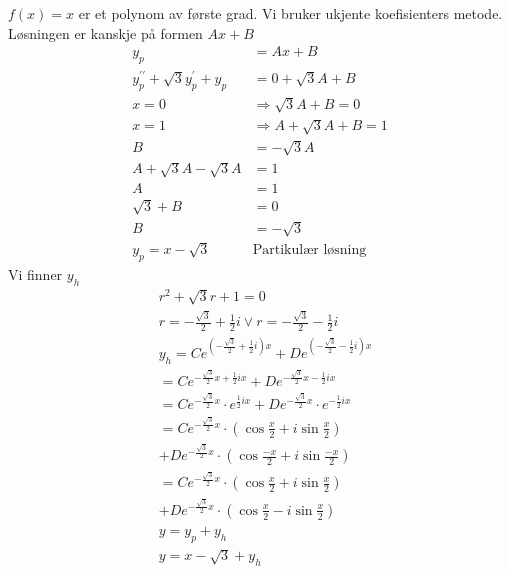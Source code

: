 \documentclass[defaultpackages]{cheatsheet}
\begin{document}
	\subsubsection{}
	$f(x) = x$ er et polynom av første grad. Vi bruker ukjente koefisienters metode. Løsningen er kanskje på formen $Ax+B$
	\begin{align*}
		y_p &= Ax + B\\
		y^{\prime\prime}_p + \sqrt{3}y_p^\prime + y_p &= 0 + \sqrt{3}A + B\\
		x=0&\Rightarrow\sqrt{3}A + B = 0\\
		x=1&\Rightarrow A\!+\!\sqrt{3}A\!+\!B=1\\
		B&=-\sqrt{3}A\\
		A + \sqrt{3}A - \sqrt{3}A &= 1\\
		A &= 1\\
		\sqrt{3} + B &= 0\\
		B &= -\sqrt{3}\\
		y_p = x - \sqrt{3} \quad&\text{Partikulær løsning}
	\end{align*}
	Vi finner $y_h$
	\begin{align*}
		&r^2 + \sqrt{3}r + 1 = 0\\
		&r = -\frac{\sqrt{3}}{2} + \frac{1}{2}i \vee r = -\frac{\sqrt{3}}{2} - \frac{1}{2}i\\
		&y_h = Ce^{\left(-\frac{\sqrt{3}}{2} + \frac{1}{2}i\right)x}+  De^{\left(-\frac{\sqrt{3}}{2} - \frac{1}{2}i\right)x}\\
		&= Ce^{-\frac{\sqrt{3}}{2}x + \frac{1}{2}ix} + De^{-\frac{\sqrt{3}}{2}x - \frac{1}{2}ix}\\
		&= Ce^{-\frac{\sqrt{3}}{2}x} \cdot e^{\frac{1}{2}ix} + De^{-\frac{\sqrt{3}}{2}x} \cdot e ^ {-\frac{1}{2}ix}\\
		&= Ce^{-\frac{\sqrt{3}}{2}x} \cdot \left(\cos\frac{x}{2} + i\sin{\frac{x}{2}}\right)\\
		&+De^{-\frac{\sqrt{3}}{2}x} \cdot \left(\cos\frac{-x}{2} + i\sin\frac{-x}{2}\right)\\
		&= Ce^{-\frac{\sqrt{3}}{2}x} \cdot \left(\cos\frac{x}{2} + i\sin{\frac{x}{2}}\right)\\
		&+De^{-\frac{\sqrt{3}}{2}x} \cdot \left(\cos\frac{x}{2} - i\sin\frac{x}{2}\right)\\
		&y = y_p + y_h\\
		&y = x - \sqrt{3} + y_h
	\end{align*}
	\subsection{}
\end{document}
